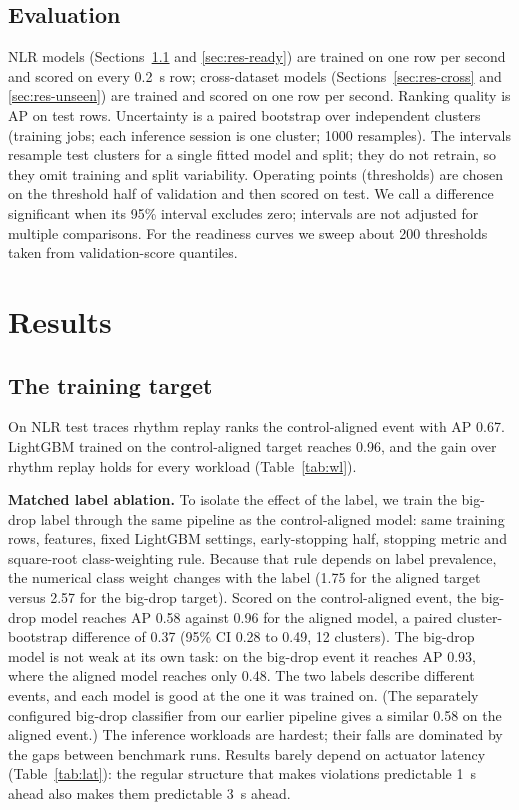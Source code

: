 \documentclass[11pt]{article}
\begin{document}
\subsection{Evaluation}

NLR models (Sections~\ref{sec:res-target} and \ref{sec:res-ready}) are trained on one row per second
and scored on every 0.2~s row; cross-dataset models (Sections~\ref{sec:res-cross} and
\ref{sec:res-unseen}) are trained and scored on one row per second. Ranking quality is AP on
test rows. Uncertainty is a paired bootstrap over independent clusters
(training jobs; each inference session is one cluster; 1000 resamples). The intervals resample test
clusters for a single fitted model and split; they do not retrain, so they omit training and split
variability. Operating points (thresholds) are chosen on the threshold half of validation and then
scored on test. We call a difference significant when its 95\% interval excludes zero; intervals are
not adjusted for multiple comparisons. For the readiness curves we sweep about 200 thresholds taken from validation-score
quantiles.

\section{Results}

\subsection{The training target}
\label{sec:res-target}

On NLR test traces rhythm replay ranks the control-aligned event with AP 0.67. LightGBM trained
on the control-aligned target reaches 0.96, and the gain over rhythm replay holds for every
workload (Table~\ref{tab:wl}).

\textbf{Matched label ablation.} To isolate the effect of the label, we train the big-drop label through
the same pipeline as the control-aligned model: same training rows, features, fixed LightGBM settings,
early-stopping half, stopping metric and square-root class-weighting rule. Because that rule depends on
label prevalence, the numerical class weight changes with the label (1.75 for the aligned target versus 2.57 for the big-drop target). Scored on the control-aligned event, the
big-drop model reaches AP 0.58 against 0.96 for the aligned model,
a paired cluster-bootstrap difference of 0.37 (95\% CI 0.28 to
0.49, 12 clusters). The big-drop model is not weak at its own task: on the big-drop
event it reaches AP 0.93, where the aligned model reaches only
0.48. The two labels describe different events, and each model is good
at the one it was trained on. (The separately configured big-drop classifier from our earlier pipeline
gives a similar 0.58 on the aligned event.)
The inference workloads are hardest; their falls are dominated by the gaps between benchmark runs.
Results barely depend on actuator latency (Table~\ref{tab:lat}): the regular structure that makes
violations predictable 1~s ahead also makes them predictable 3~s ahead.
\end{document}

